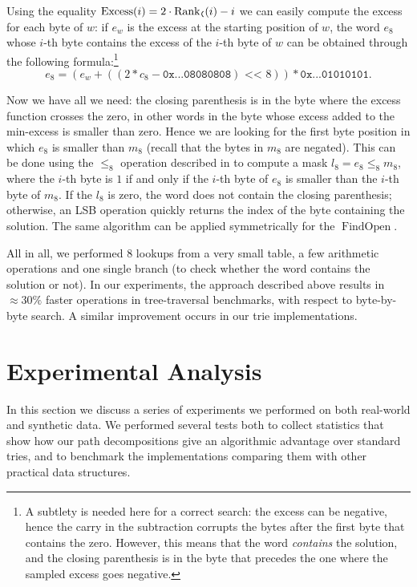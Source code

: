 \documentclass[a4paper,11pt]{article}
\theoremstyle{nonumberplain}
\DeclareMathOperator{\Rank}{Rank}
\DeclareMathOperator{\Excess}{Excess}
\DeclareMathOperator{\FindOpen}{FindOpen}
\newcommand{\paropen}{\text{\bf\texttt{(}}}
\begin{document}
Using the equality $\Excess(i) = 2\cdot
\Rank_\paropen(i) - i$ we can easily compute the excess for each byte
of $w$: if $e_w$ is the excess at the starting position of $w$, the
word $e_8$ whose $i$-th byte contains the excess of the $i$-th byte of
$w$ can be obtained through the following formula:\footnote{A subtlety is needed here for a correct search: the excess can be negative, hence the carry
in the subtraction corrupts the bytes after the first byte that
contains the zero. However, this means that the word \emph{contains}
the solution, and the closing parenthesis is in the byte that precedes
the one where the sampled excess goes negative.
}
\begin{equation*}
  e_8 = (e_w + ((2 * c_8 - \texttt{0x...08080808}) \texttt{ <{}< } 8)) * \texttt{0x...01010101} \text{.}
\end{equation*}

Now we have all we need: the closing parenthesis is in the byte where
the excess function crosses the zero, in other words in the byte whose
excess added to the min-excess is smaller than zero. Hence we are
looking for the first byte position in which $e_8$ is smaller than
$m_8$ (recall that the bytes in $m_8$ are negated). This can be done using the $\leq_8$ operation described in
\cite{knuthtaocp} to compute a mask $l_8 = e_8 \leq_8 m_8$, where the
$i$-th byte is $1$ if and only if the $i$-th byte of $e_8$ is smaller
than the $i$-th byte of $m_8$. If the $l_8$ is zero, the word does not
contain the closing parenthesis; otherwise, an LSB operation quickly
returns the index of the byte containing the solution. The same
algorithm can be applied symmetrically for the $\FindOpen$.

All in all, we performed $8$ lookups from a very small table, a few
arithmetic operations and one single branch (to check whether the word
contains the solution or not). In our experiments, the approach
described above results in $\approx 30\%$ faster operations in
tree-traversal benchmarks, with respect to byte-by-byte search. 
A similar improvement occurs in our trie
implementations.

\section{Experimental Analysis}
\label{sec:experimental-analys}
In this section we discuss a series of experiments we performed on
both real-world and synthetic data. We performed several tests both to
collect statistics that show how our path decompositions give an
algorithmic advantage over standard tries, and to benchmark the
implementations comparing them with other practical
data structures.
\end{document}

